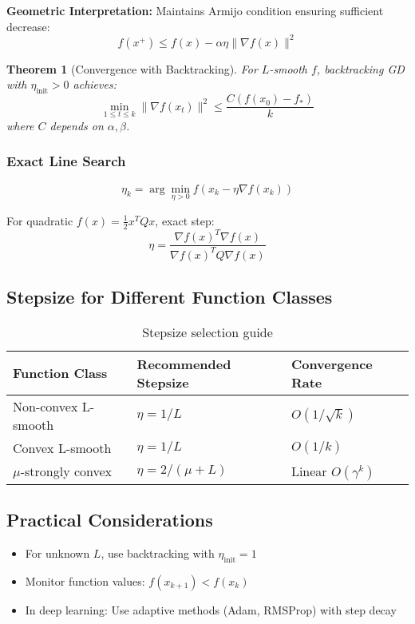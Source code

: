 \documentclass{article}
\newtheorem{theorem}{Theorem}
\begin{document}
\textbf{Geometric Interpretation:} Maintains Armijo condition ensuring sufficient decrease:
\begin{equation}
f(x^+) \leq f(x) - \alpha\eta\|\nabla f(x)\|^2
\end{equation}

\begin{theorem}[Convergence with Backtracking]
For \( L \)-smooth \( f \), backtracking GD with \( \eta_{\text{init}} > 0 \) achieves:
\[
\min_{1\leq t\leq k} \|\nabla f(x_t)\|^2 \leq \frac{C(f(x_0) - f_*)}{k}
\]
where \( C \) depends on \( \alpha, \beta \).
\end{theorem}

\subsubsection{Exact Line Search}
\[
\eta_k = \arg\min_{\eta > 0} f(x_k - \eta\nabla f(x_k))
\]

\begin{example}
For quadratic \( f(x) = \frac{1}{2}x^TQx \), exact step:
\[
\eta = \frac{\nabla f(x)^T\nabla f(x)}{\nabla f(x)^T Q \nabla f(x)}
\]
\end{example}

\subsection{Stepsize for Different Function Classes}

\begin{table}[h]
\centering
\begin{tabular}{|l|l|l|}
\hline
\textbf{Function Class} & \textbf{Recommended Stepsize} & \textbf{Convergence Rate} \\
\hline
Non-convex L-smooth & \( \eta = 1/L \) & \( O(1/\sqrt{k}) \) \\
Convex L-smooth & \( \eta = 1/L \) & \( O(1/k) \) \\
\(\mu\)-strongly convex & \( \eta = 2/(\mu + L) \) & Linear \( O(\gamma^k) \) \\
\hline
\end{tabular}
\caption{Stepsize selection guide}
\end{table}



\subsection{Practical Considerations}
\begin{itemize}
\item For unknown \( L \), use backtracking with \( \eta_{\text{init}} = 1 \)
\item Monitor function values: \( f(x_{k+1}) < f(x_k) \)
\item In deep learning: Use adaptive methods (Adam, RMSProp) with step decay
\end{itemize}
\end{document}
